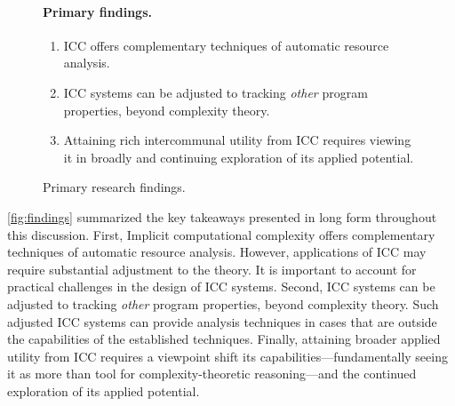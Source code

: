 \begin{figure}[h]
\begin{mdframed} %
\paragraph*{Primary findings.}
\begin{enumerate}[wide, labelwidth=!, labelindent=0pt]
\item ICC offers complementary techniques of automatic resource analysis.
\item ICC systems can be adjusted to tracking \emph{other} program properties, beyond complexity theory.
\item Attaining rich intercommunal utility from ICC requires viewing it in broadly and continuing exploration of its applied potential.
\end{enumerate}
\end{mdframed}
\caption[Primary research findings summarized]{Primary research findings.}
\label{fig:findings}
\end{figure}

\autoref{fig:findings} summarized the key takeaways presented in long form throughout this discussion.
First, Implicit computational complexity offers complementary techniques of automatic resource analysis.
However, applications of ICC may require substantial adjustment to the theory.
It is important to account for practical challenges in the design of ICC systems.
Second, ICC systems can be adjusted to tracking \emph{other} program properties, beyond complexity theory.
Such adjusted ICC systems can provide analysis techniques in cases that are outside the capabilities of the established techniques.
Finally, attaining broader applied utility from ICC requires a viewpoint shift \wrt its capabilities---\ie fundamentally seeing it as more than tool for complexity-theoretic reasoning---and the continued exploration of its applied potential.
